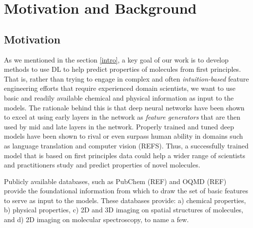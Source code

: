 \section{Motivation and Background  \label{background}}
\subsection{Motivation}
As we mentioned in the section \ref{intro}, a key goal of our work  is to develop methods to use DL to help predict properties of molecules from first principles. That is, rather than trying to engage in complex and often {\em intuition-based} feature engineering efforts that require experienced domain scientists, we want to use basic and readily available chemical and physical information as input to the models. The rationale behind this is that deep neural networks have been shown to excel at using early layers in the network as {\em feature generators} that are then used by mid and late layers in the network. Properly trained and tuned deep models have been shown to rival or even surpass  human ability in domains such as language translation and computer vision (REFS). Thus, a successfully trained model that is based on first principles data could help a wider range of scientists and practitioners study and predict properties of novel molecules. 

Publicly available databases, such as PubChem (REF) and OQMD (REF) provide the foundational information from which to draw the set of basic features to serve as input  to the models. These databases provide: a) chemical properties, b) physical properties, c) 2D and 3D imaging on spatial structures of molecules,  and d) 2D imaging on molecular spectroscopy, to name a few.

